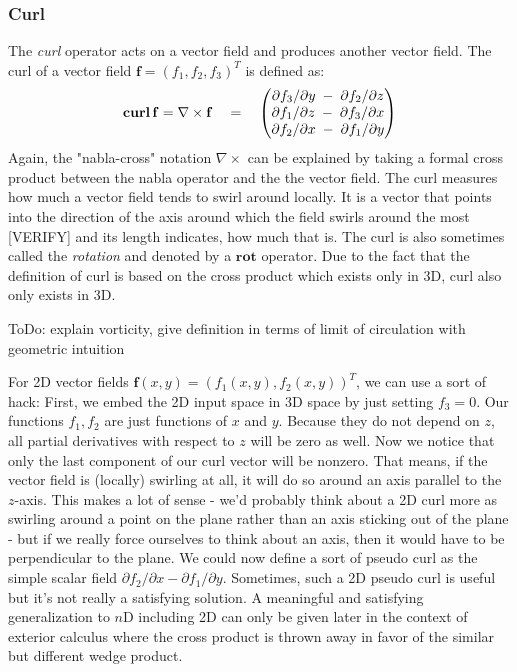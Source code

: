 \subsubsection{Curl}
The \emph{curl} operator acts on a vector field and produces another vector field. The curl of a vector field $\mathbf{f} = (f_1, f_2, f_3)^T$ is defined as:
\begin{equation}
 \operatorname{\mathbf{curl}} \mathbf{f} = \nabla \times \mathbf{f}  \quad = \quad
 \begin{pmatrix}
	\partial f_3 / \partial y \; - \; \partial f_2 / \partial z \\
	\partial f_1 / \partial z \; - \; \partial f_3 / \partial x \\
	\partial f_2 / \partial x \; - \; \partial f_1 / \partial y
\end{pmatrix} 
\end{equation}
Again, the "nabla-cross" notation  $\nabla \times$ can be explained by taking a formal cross product between the nabla operator and the the vector field. The curl measures how much a vector field tends to swirl around locally. It is a vector that points into the direction of the axis around which the field swirls around the most [VERIFY] and its length indicates, how much that is. The curl is also sometimes called the \emph{rotation} and denoted by a $\mathbf{rot}$ operator. Due to the fact that the definition of curl is based on the cross product which exists only in 3D, curl also only exists in 3D. 

ToDo: explain vorticity, give definition in terms of limit of circulation with geometric intuition

%

\medskip
For 2D vector fields $\mathbf{f}(x,y) = (f_1(x,y), f_2(x,y))^T$, we can use a sort of hack: First, we embed the 2D input space in 3D space by just setting $f_3 = 0$. Our functions $f_1, f_2$ are just functions of $x$ and $y$.  Because they do not depend on $z$, all partial derivatives with respect to $z$ will be zero as well. Now we notice that only the last component of our curl vector will be nonzero. That means, if the vector field is (locally) swirling at all, it will do so around an axis parallel to the $z$-axis. This makes a lot of sense - we'd probably think about a 2D curl more as swirling around a point on the plane rather than an axis sticking out of the plane - but if we really force ourselves to think about an axis, then it would have to be perpendicular to the plane. We could now define a sort of pseudo curl as the simple scalar field $\partial f_2 / \partial x - \partial f_1 / \partial y$. Sometimes, such a 2D pseudo curl is useful but it's not really a satisfying solution. A meaningful and satisfying generalization to $n$D including 2D can only be given later in the context of exterior calculus where the cross product is thrown away in favor of the similar but different wedge product. 

